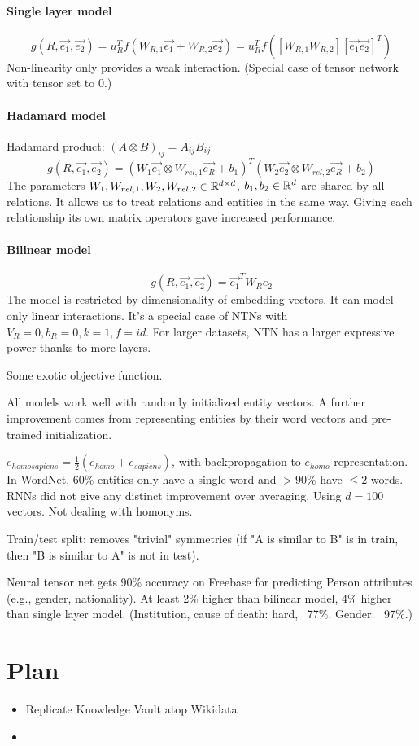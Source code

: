 \paragraph{Single layer model} $$g(R,\vec{e_1},\vec{e_2})=u_R^T
f(W_{R,1}\vec{e_1} + W_{R,2}\vec{e_2})=u_R^T f([W_{R,1}
W_{R,2}] [\vec{e_1} \vec{e_2}]^T)$$
Non-linearity only provides a weak interaction.
(Special case of tensor network with tensor set to 0.)

\paragraph{Hadamard model}
Hadamard product: $(A\otimes B)_{ij}=A_{ij}B_{ij}$
$$g(R,\vec{e_1},\vec{e_2})=(W_1 \vec{e_1}\otimes W_{rel,1}\vec{e_R}+b_1)^T (W_2
\vec{e_2}\otimes W_{rel,2}\vec{e_R}+b_2)$$
The parameters $W_1,W_{rel,1},W_2,W_{rel,2}\in\mathbb{R}^{d\times d}$, $b_1,b_2\in\mathbb{R}^d$
are shared by all relations. It allows us to treat relations and entities in the
same way. Giving each relationship its own matrix operators gave increased
performance.

\paragraph{Bilinear model}
$$g(R,\vec{e_1},\vec{e_2})=\vec{e_1}^T W_R e_2$$
The model is restricted by dimensionality of embedding vectors. It can model
only linear interactions. It's a special case of NTNs with
$V_R=0,b_R=0,k=1,f=id$. For larger datasets, NTN has a larger expressive power
thanks to more layers.

Some exotic objective function.

All models work well with randomly initialized entity vectors.
A further improvement comes from representing entities by their word vectors
and pre-trained initialization.

$e_{homo sapiens} = \frac{1}{2}(e_{homo} + e_{sapiens})$, with backpropagation
to $e_{homo}$ representation.
In WordNet, 60\% entities only have a single word and $>90\%$ have $\leq 2$
words. RNNs did not give any distinct improvement over averaging.
Using $d=100$ vectors. Not dealing with homonyms.

Train/test split: removes "trivial" symmetries (if "A is similar to B" is in
train, then "B is similar to A" is not in test).

Neural tensor net gets 90\% accuracy on Freebase for predicting Person
attributes (e.g., gender, nationality). At least 2\% higher than bilinear model,
4\% higher than single layer model. (Institution, cause of death: hard, ~77\%.
Gender: ~97\%.)

\section{Plan}

\begin{itemize}
\item Replicate Knowledge Vault atop Wikidata
\item 
\end{itemize}
